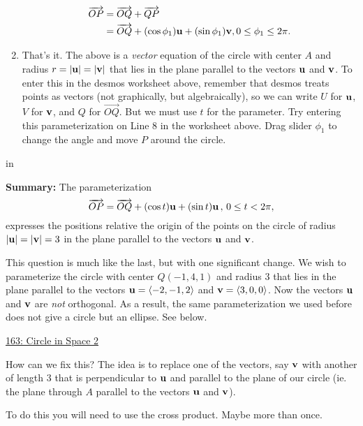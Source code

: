 \documentclass{ximera}
\newcommand{\pskip}{\vskip 0.1 in}
\begin{document}
\begin{question}
\begin{enumerate}
{\begin{expandable}
\begin{align*}
   \overrightarrow{OP} &= \overrightarrow{OQ} + \overrightarrow{QP} \\
                                   & = \overrightarrow{OQ} + (\cos\phi_1) {\bf u} + (\sin\phi_1){\bf v} , 0\leq \phi_1 \leq 2\pi .
\end{align*}
\end{expandable}
}

\item{That's it. The above is a \emph{vector} equation of the circle with center $A$ and radius $r=|{\bf u}| = |{\bf v}|$ that lies in the plane parallel to the vectors ${\bf u}$ and ${\bf v}$. To enter this in the desmos worksheet above, remember that desmos treats points as vectors (not graphically, but algebraically), so we can write $U$ for ${\bf u}$, $V$ for ${\bf v}$, and $Q$ for $\overrightarrow{OQ}$. But we must use $t$ for the parameter. Try entering this parameterization on Line 8 in the worksheet above. Drag slider $\phi_1$ to change the angle and move $P$ around the circle.
}
\end{enumerate}

\pskip

{\bf Summary:} The parameterization
\[
      \overrightarrow{OP} = \overrightarrow{OQ} + (\cos t){\bf u} + (\sin t){\bf u}\, , \, 0\leq t < 2\pi ,
\]
expresses the positions relative the origin of the points on the circle of radius $|{\bf u}| = |{\bf v}|=3$ in the plane parallel to the vectors ${\bf u}$ and ${\bf v}$.
\end{question}


\begin{question}  \label{Q98de983234}
This question is much like the last, but with one significant change. We wish to parameterize the circle with center $Q(-1,4,1)$ and radius $3$ that lies in the plane parallel to the vectors ${\bf u} = \langle -2, -1, 2 \rangle$ and ${\bf v}= \langle 3,0,0 \rangle$. 
Now the vectors ${\bf u}$ and ${\bf v}$ are \emph{not} orthogonal. As a result, the same parameterization we used before does not give a circle but an ellipse. See below.

\begin{onlineOnly}
    \begin{center}
\end{center}
\end{onlineOnly}

\href{https://www.desmos.com/3d/k5idcpjrep}{163: Circle in Space 2}

How can we fix this? The idea is to replace one of the vectors, say ${\bf v}$ with another of length $3$ that is perpendicular to ${\bf u}$ and parallel to the plane of our circle (ie. the plane through $A$ parallel to the vectors ${\bf u}$ and ${\bf v}$). 

\begin{hint}
To do this you will need to use the cross product. Maybe more than once. 
\end{hint}


\end{question}
\end{document}
